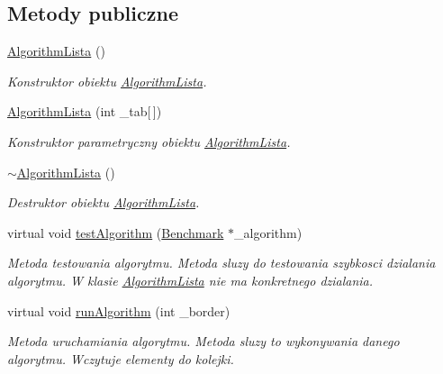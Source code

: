 \subsection*{Metody publiczne}
\begin{DoxyCompactItemize}
\item 
\hyperlink{class_algorithm_lista_a4c7749379de38154982288419f305141}{Algorithm\-Lista} ()
\begin{DoxyCompactList}\small\item\em Konstruktor obiektu \hyperlink{class_algorithm_lista}{Algorithm\-Lista}. \end{DoxyCompactList}\item 
\hyperlink{class_algorithm_lista_ab5aed5527ca4f27c213e97fa19f6e32d}{Algorithm\-Lista} (int \-\_\-tab\mbox{[}$\,$\mbox{]})
\begin{DoxyCompactList}\small\item\em Konstruktor parametryczny obiektu \hyperlink{class_algorithm_lista}{Algorithm\-Lista}. \end{DoxyCompactList}\item 
\hyperlink{class_algorithm_lista_a2d7c5ef95cdfe523a86b01da06d0fb2e}{$\sim$\-Algorithm\-Lista} ()
\begin{DoxyCompactList}\small\item\em Destruktor obiektu \hyperlink{class_algorithm_lista}{Algorithm\-Lista}. \end{DoxyCompactList}\item 
virtual void \hyperlink{class_algorithm_lista_a1e1f93e75b4a635098bf30ec32f19903}{test\-Algorithm} (\hyperlink{class_benchmark}{Benchmark} $\ast$\-\_\-algorithm)
\begin{DoxyCompactList}\small\item\em Metoda testowania algorytmu. Metoda sluzy do testowania szybkosci dzialania algorytmu. W klasie \hyperlink{class_algorithm_lista}{Algorithm\-Lista} nie ma konkretnego dzialania. \end{DoxyCompactList}\item 
virtual void \hyperlink{class_algorithm_lista_a5c41dbbd3ae7a9ac34edec1a51bc8eb1}{run\-Algorithm} (int \-\_\-border)
\begin{DoxyCompactList}\small\item\em Metoda uruchamiania algorytmu. Metoda sluzy to wykonywania danego algorytmu. Wczytuje elementy do kolejki. \end{DoxyCompactList}\end{DoxyCompactItemize}
